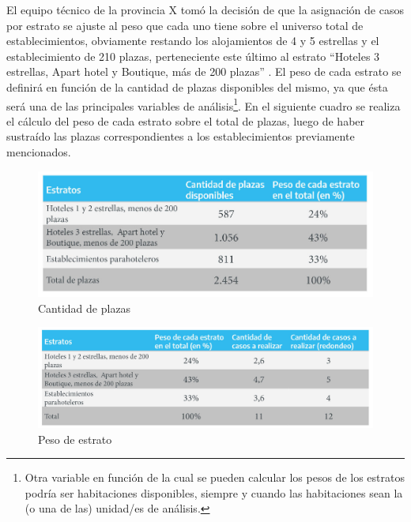 \documentclass[
]{book}
\begin{document}
El equipo técnico de la provincia X tomó la decisión de que la asignación de casos por estrato se ajuste al peso que cada uno tiene sobre el universo total de establecimientos, obviamente restando los alojamientos de 4 y 5 estrellas y el establecimiento de 210 plazas, perteneciente este último al estrato ``Hoteles 3 estrellas, Apart hotel y Boutique, más de 200 plazas'' . El peso de cada estrato se definirá en función de la cantidad de plazas disponibles del mismo, ya que ésta será una de las principales variables de análisis\footnote{Otra variable en función de la cual se pueden calcular los pesos de los estratos podría ser habitaciones disponibles, siempre y cuando las habitaciones sean la (o una de las) unidad/es de análisis.}. En el siguiente cuadro se realiza el cálculo del peso de cada estrato sobre el total de plazas, luego de haber sustraído las plazas correspondientes a los establecimientos previamente mencionados.

\begin{figure}

{\centering \includegraphics[width=1\linewidth]{imagenes/tabla_2A} 

}

\caption{Cantidad de plazas}\label{fig:cantidad-de-plazas}
\end{figure}

\begin{figure}

{\centering \includegraphics[width=1\linewidth]{imagenes/tabla_2B} 

}

\caption{Peso de estrato}\label{fig:peso-de-estrato}
\end{figure}
\end{document}
